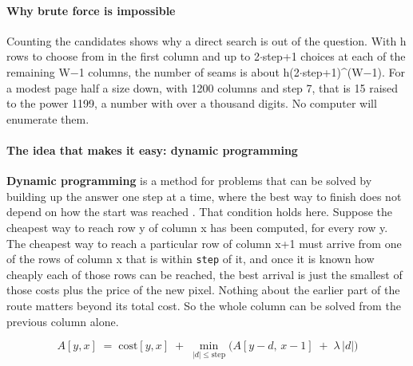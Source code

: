 \paragraph{Why brute force is impossible}
Counting the candidates shows why a direct search is out of the question. With h rows to choose from in the first column and up to 2$\cdot$step+1 choices at each of the remaining W$-$1 columns, the number of seams is about h(2$\cdot$step+1)\textasciicircum{}(W$-$1). For a modest page half a size down, with 1200 columns and step 7, that is 15 raised to the power 1199, a number with over a thousand digits. No computer will enumerate them.


\paragraph{The idea that makes it easy: dynamic programming}
\textbf{Dynamic programming} is a method for problems that can be solved by building up the answer one step at a time, where the best way to finish does not depend on how the start was reached \cite{bellman1954}. That condition holds here. Suppose the cheapest way to reach row y of column x has been computed, for every row y. The cheapest way to reach a particular row of column x+1 must arrive from one of the rows of column x that is within \texttt{step} of it, and once it is known how cheaply each of those rows can be reached, the best arrival is just the smallest of those costs plus the price of the new pixel. Nothing about the earlier part of the route matters beyond its total cost. So the whole column can be solved from the previous column alone.


\begin{equation}
A[y,x] \;=\; \mathrm{cost}[y,x] \;+\; \min_{|d| \le \mathrm{step}} \Big( A[y-d,\,x-1] \;+\; \lambda\,|d| \Big)
\end{equation}

